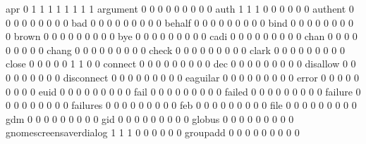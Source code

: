 \documentclass[compress,8pt]{beamer}
\begin{document}
\begin{frame}
\begin{Schunk}
  apr                                        0   1   1   1   1   1   1   1   1
  argument                                   0   0   0   0   0   0   0   0   0
  auth                                       1   1   1   0   0   0   0   0   0
  authent                                    0   0   0   0   0   0   0   0   0
  bad                                        0   0   0   0   0   0   0   0   0
  behalf                                     0   0   0   0   0   0   0   0   0
  bind                                       0   0   0   0   0   0   0   0   0
  brown                                      0   0   0   0   0   0   0   0   0
  bye                                        0   0   0   0   0   0   0   0   0
  cadi                                       0   0   0   0   0   0   0   0   0
  chan                                       0   0   0   0   0   0   0   0   0
  chang                                      0   0   0   0   0   0   0   0   0
  check                                      0   0   0   0   0   0   0   0   0
  clark                                      0   0   0   0   0   0   0   0   0
  close                                      0   0   0   0   0   1   1   0   0
  connect                                    0   0   0   0   0   0   0   0   0
  dec                                        0   0   0   0   0   0   0   0   0
  disallow                                   0   0   0   0   0   0   0   0   0
  disconnect                                 0   0   0   0   0   0   0   0   0
  eaguilar                                   0   0   0   0   0   0   0   0   0
  error                                      0   0   0   0   0   0   0   0   0
  euid                                       0   0   0   0   0   0   0   0   0
  fail                                       0   0   0   0   0   0   0   0   0
  failed                                     0   0   0   0   0   0   0   0   0
  failure                                    0   0   0   0   0   0   0   0   0
  failures                                   0   0   0   0   0   0   0   0   0
  feb                                        0   0   0   0   0   0   0   0   0
  file                                       0   0   0   0   0   0   0   0   0
  gdm                                        0   0   0   0   0   0   0   0   0
  gid                                        0   0   0   0   0   0   0   0   0
  globus                                     0   0   0   0   0   0   0   0   0
  gnomescreensaverdialog                     1   1   1   0   0   0   0   0   0
  groupadd                                   0   0   0   0   0   0   0   0   0

\end{Schunk}
\end{frame}
\end{document}
